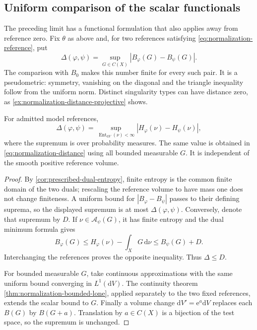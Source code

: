 \subsection{Uniform comparison of the scalar functionals}

The preceding limit has a functional formulation that also applies away from reference zero. Fix $\theta$ as above and, for two references satisfying \eqref{eq:normalization-reference}, put
\begin{equation}\label{eq:normalization-distance}
 \Delta(\varphi,\psi)
   =\sup_{G\in C(X)}|B_\varphi(G)-B_\psi(G)|.
\end{equation}
The comparison with $B_0$ makes this number finite for every such pair. It is a pseudometric: symmetry, vanishing on the diagonal and the triangle inequality follow from the uniform norm. Distinct singularity types can have distance zero, as \cref{ex:normalization-distance-projective} shows.

\begin{proposition}\label{prop:normalization-distance-dual}
For admitted model references,
\[
 \Delta(\varphi,\psi)
 =\sup_{\operatorname{Ent}_{\mathrm{d}V}(\nu)<\infty}
                       |H_\varphi(\nu)-H_\psi(\nu)|,
\]
where the supremum is over probability measures. The same value is obtained in \eqref{eq:normalization-distance} using all bounded measurable $G$. It is independent of the smooth positive reference volume.
\end{proposition}
\begin{proof}
By \cref{cor:prescribed-dual-entropy}, finite entropy is the common finite domain of the two duals; rescaling the reference volume to have mass one does not change finiteness. A uniform bound for $|B_\varphi-B_\psi|$ passes to their defining suprema, so the displayed supremum is at most $\Delta(\varphi,\psi)$. Conversely, denote that supremum by $D$. If $\nu\in\mathcal A_\psi(G)$, it has finite entropy and the dual minimum formula gives
\[
 B_\varphi(G)
 \leq H_\varphi(\nu)-\int_XG\,\mathrm{d}\nu
 \leq B_\psi(G)+D.
\]
Interchanging the references proves the opposite inequality. Thus $\Delta\leq D$.

For bounded measurable $G$, take continuous approximations with the same uniform bound converging in $L^1(\mathrm{d}V)$. The continuity theorem \cref{thm:normalization-bounded-lone}, applied separately to the two fixed references, extends the scalar bound to $G$. Finally a volume change $\mathrm{d}V'=\mathrm{e}^a\mathrm{d}V$ replaces each $B(G)$ by $B(G+a)$. Translation by $a\in C(X)$ is a bijection of the test space, so the supremum is unchanged.
\end{proof}

